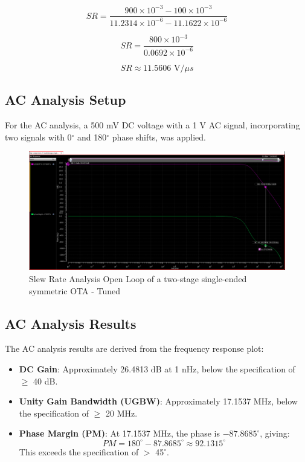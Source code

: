 \begin{equation}
    SR = \frac{900 \times 10^{-3} - 100 \times 10^{-3}}{11.2314 \times 10^{-6} - 11.1622 \times 10^{-6}}
\end{equation}

\begin{equation}
    SR = \frac{800 \times 10^{-3}}{0.0692 \times 10^{-6}}
\end{equation}

\begin{equation}
    SR \approx 11.5606 \text{ V/} \mu s
\end{equation}


\subsection{AC Analysis Setup}
For the AC analysis, a 500 mV DC voltage with a 1 V AC signal, incorporating two signals with 0$^\circ$ and 180$^\circ$ phase shifts, was applied.


    \begin{figure}[h]
        \centering
           \includegraphics[width=1\textwidth]{images/fine_tuned.png}
        \caption{Slew Rate Analysis Open Loop of a two-stage single-ended symmetric OTA - Tuned  }
        \label{fig: }
    \end{figure}
\newpage
\subsection{AC Analysis Results}
The AC analysis results are derived from the frequency response plot:

\begin{itemize}
    \item \textbf{DC Gain}: Approximately 26.4813 dB at 1 nHz, below the specification of $\geq$ 40 dB.
    \item \textbf{Unity Gain Bandwidth (UGBW)}: Approximately 17.1537 MHz, below the specification of $\geq$ 20 MHz.
    \item \textbf{Phase Margin (PM)}: At 17.1537 MHz, the phase is $-87.8685^\circ$, giving:
    \begin{equation}
        PM = 180^\circ - 87.8685^\circ \approx 92.1315^\circ
    \end{equation}
    This exceeds the specification of $>$ 45$^\circ$.
\end{itemize}

